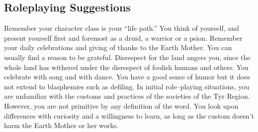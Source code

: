 \documentclass[10pt,a4paper,twocolumn]{d20}
\begin{document}
{\subsection{Roleplaying Suggestions}
Remember your character class is your ``life path.'' You think of yourself, and present yourself first and foremost as a druid, a warrior or a psion. Remember your daily celebrations and giving of thanks to the Earth Mother. You can usually find a reason to be grateful. Disrespect for the land angers you, since the whole land has withered under the disrespect of foolish humans and others. You celebrate with song and with dance. You have a good sense of humor but it does not extend to blasphemies such as defiling. In initial role–playing situations, you are unfamiliar with the customs and practices of the societies of the Tyr Region. However, you are not primitive by any definition of the word. You look upon differences with curiosity and a willingness to learn, as long as the custom doesn’t harm the Earth Mother or her works.

}
\end{document}
